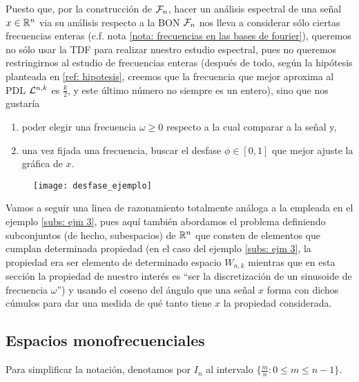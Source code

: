 Puesto que, por la construcción de $\mathcal{F}_{n}$, 
hacer un análisis espectral de una señal $x \in \mathbb{R}^{n}$
via su análisis respecto a la BON $\mathcal{F}_{n}$ nos lleva
a considerar sólo ciertas frecuencias enteras
(c.f. nota \ref{nota: frecuencias en las bases de fourier}),
queremos no sólo usar la TDF para realizar
nuestro estudio espectral, pues
no queremos restringirnos
al estudio de frecuencias enteras
(después de todo, según la hipótesis planteada en 
\ref{ref: hipotesis}, 
creemos que la frecuencia que mejor aproxima al PDL
$\mathcal{L}^{n,k}$ es $\frac{k}{2}$, y este último número no siempre
es un entero), sino que nos gustaría
\begin{enumerate}
	\item poder elegir una frecuencia $\omega \geq 0$ respecto
a la cual comparar a la señal y,
	\item una vez fijada una frecuencia, buscar el desfase $\phi \in [0,1]$
	que mejor ajuste la gráfica de $x$.
\end{enumerate}

\begin{figure}[H]
	\centering
	\texttt{[image: desfase\_ejemplo]} 
\end{figure}	


Vamos a seguir
una linea de razonamiento totalmente análoga a la empleada 
en el ejemplo \ref{subs: ejm 3}, pues aquí también abordamos el problema
definiendo subconjuntos (de hecho, subespacios)
de $\mathbb{R}^{n}$ que consten de elementos que cumplan
determinada propiedad (en el caso del ejemplo \ref{subs: ejm 3}, la propiedad
era ser elemento de determinado espacio $W_{n,k}$ mientras que 
en esta sección la propiedad de nuestro interés es ``ser la discretización
de un sinusoide de frecuencia $\omega$'') y usando el coseno del ángulo que
una señal $x$ forma con dichos cúmulos para dar una medida de qué tanto
tiene $x$ la propiedad considerada.


\subsection{Espacios monofrecuenciales}

\begin{notacion}
Para simplificar la notación, denotamos por $I_{n}$ al intervalo
$\{ \frac{m}{n}  : 0 \leq m \leq n-1 \}$.
\end{notacion}

